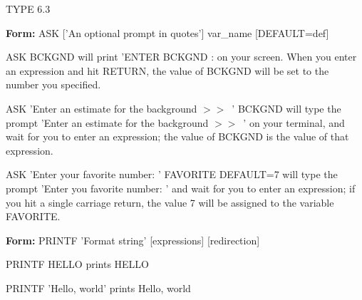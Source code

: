{\newpage\clearpage
{}%
\begin{hanging}
  \item{TYPE 6.3}
\end{hanging}%
\lthtmlfigureZ
\lthtmlcheckvsize\clearpage}

{\newpage\clearpage
{}%
\begin{command}
  \item[\textbf{Form: } ASK {['An optional prompt in quotes']} var\_name {[DEFAULT=def]}\hfill]{}
\end{command}%
\lthtmlfigureZ
\lthtmlcheckvsize\clearpage}

{\newpage\clearpage
{}%
\begin{example}
  \item[ASK BCKGND\hfill]{will print 'ENTER BCKGND : on your screen.  When
       you enter an expression and hit RETURN, the value of BCKGND will be
       set to the number you specified.}
\par\item[ASK 'Enter an estimate for the background $>>$\  ' BCKGND \hfill]
       {will type the prompt 'Enter an estimate for the background $>>$\  ' on
       your terminal, and wait for you to enter an expression; the value of
       BCKGND is the value of that expression.}
\par\item[ASK 'Enter your favorite number: ' FAVORITE DEFAULT=7\hfill]
       { will type the prompt 'Enter you favorite number: ' and wait for
       you to enter an expression; if you hit a single carriage return, the
       value 7 will be assigned to the variable FAVORITE.}
\par\end{example}%
\lthtmlfigureZ
\lthtmlcheckvsize\clearpage}

{\newpage\clearpage
{}%
\begin{command}
  \item[\textbf{Form: } PRINTF 'Format string' {[expressions]} {[redirection]}\hfill]{}
\end{command}%
\lthtmlfigureZ
\lthtmlcheckvsize\clearpage}

{\newpage\clearpage
{}%
\begin{example}
  \item[PRINTF HELLO\hfill]{prints HELLO}
  \item[PRINTF 'Hello, world'\hfill]{prints Hello, world}
\end{example}%
\lthtmlfigureZ
\lthtmlcheckvsize\clearpage}

